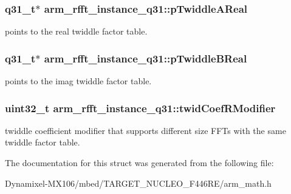 \subsubsection[{\texorpdfstring{p\+Twiddle\+A\+Real}{pTwiddleAReal}}]{\setlength{\rightskip}{0pt plus 5cm}q31\+\_\+t$\ast$ arm\+\_\+rfft\+\_\+instance\+\_\+q31\+::p\+Twiddle\+A\+Real}\hypertarget{structarm__rfft__instance__q31_a2a0c944e66bab92fcbe19d1c29153250}{}\label{structarm__rfft__instance__q31_a2a0c944e66bab92fcbe19d1c29153250}
points to the real twiddle factor table. 
\subsubsection[{\texorpdfstring{p\+Twiddle\+B\+Real}{pTwiddleBReal}}]{\setlength{\rightskip}{0pt plus 5cm}q31\+\_\+t$\ast$ arm\+\_\+rfft\+\_\+instance\+\_\+q31\+::p\+Twiddle\+B\+Real}\hypertarget{structarm__rfft__instance__q31_ae5070be4c2e0327e618f5e1f4c5b9d80}{}\label{structarm__rfft__instance__q31_ae5070be4c2e0327e618f5e1f4c5b9d80}
points to the imag twiddle factor table. 
\subsubsection[{\texorpdfstring{twid\+Coef\+R\+Modifier}{twidCoefRModifier}}]{\setlength{\rightskip}{0pt plus 5cm}uint32\+\_\+t arm\+\_\+rfft\+\_\+instance\+\_\+q31\+::twid\+Coef\+R\+Modifier}\hypertarget{structarm__rfft__instance__q31_a6fc90252b579f7c29e01bd279334fc43}{}\label{structarm__rfft__instance__q31_a6fc90252b579f7c29e01bd279334fc43}
twiddle coefficient modifier that supports different size F\+F\+Ts with the same twiddle factor table. 

The documentation for this struct was generated from the following file\+:\begin{DoxyCompactItemize}
\item 
Dynamixel-\/\+M\+X106/mbed/\+T\+A\+R\+G\+E\+T\+\_\+\+N\+U\+C\+L\+E\+O\+\_\+\+F446\+R\+E/arm\+\_\+math.\+h\end{DoxyCompactItemize}
